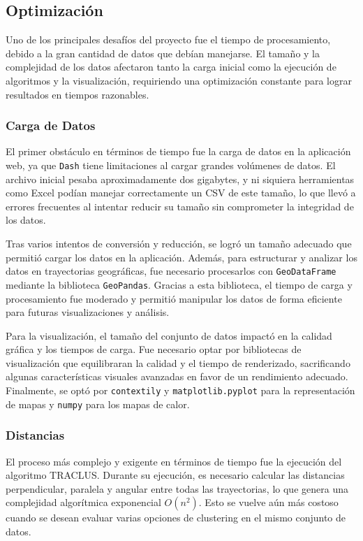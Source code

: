 \subsection{Optimización}

Uno de los principales desafíos del proyecto fue el tiempo de procesamiento, debido a la gran cantidad de datos que debían manejarse. El tamaño y la complejidad de los datos afectaron tanto la carga inicial como la ejecución de algoritmos y la visualización, requiriendo una optimización constante para lograr resultados en tiempos razonables.

\subsubsection{Carga de Datos}

El primer obstáculo en términos de tiempo fue la carga de datos en la aplicación web, ya que \texttt{Dash} tiene limitaciones al cargar grandes volúmenes de datos. El archivo inicial pesaba aproximadamente dos gigabytes, y ni siquiera herramientas como Excel podían manejar correctamente un CSV de este tamaño, lo que llevó a errores frecuentes al intentar reducir su tamaño sin comprometer la integridad de los datos.

Tras varios intentos de conversión y reducción, se logró un tamaño adecuado que permitió cargar los datos en la aplicación. Además, para estructurar y analizar los datos en trayectorias geográficas, fue necesario procesarlos con \texttt{GeoDataFrame} mediante la biblioteca \texttt{GeoPandas}. Gracias a esta biblioteca, el tiempo de carga y procesamiento fue moderado y permitió manipular los datos de forma eficiente para futuras visualizaciones y análisis.

Para la visualización, el tamaño del conjunto de datos impactó en la calidad gráfica y los tiempos de carga. Fue necesario optar por bibliotecas de visualización que equilibraran la calidad y el tiempo de renderizado, sacrificando algunas características visuales avanzadas en favor de un rendimiento adecuado. Finalmente, se optó por \texttt{contextily} y \texttt{matplotlib.pyplot} para la representación de mapas y \texttt{numpy} para los mapas de calor.

\subsubsection{Distancias}

El proceso más complejo y exigente en términos de tiempo fue la ejecución del algoritmo TRACLUS. Durante su ejecución, es necesario calcular las distancias perpendicular, paralela y angular entre todas las trayectorias, lo que genera una complejidad algorítmica exponencial \(O(n^2)\). Esto se vuelve aún más costoso cuando se desean evaluar varias opciones de clustering en el mismo conjunto de datos.

